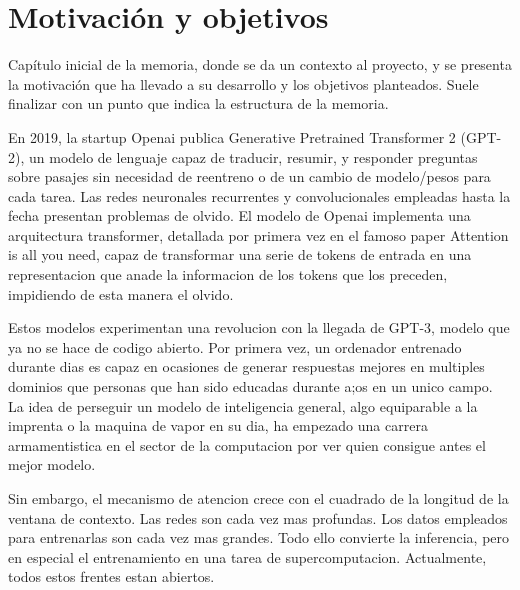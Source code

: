 \chapter{Motivación y objetivos}

Capítulo inicial de la memoria, donde se da un contexto al proyecto, y se presenta la motivación que ha llevado a su desarrollo y los objetivos planteados. Suele finalizar con un punto que indica la estructura de la memoria.


En 2019, la startup Openai publica Generative Pretrained Transformer 2 (GPT-2), un modelo de lenguaje capaz de traducir, resumir, y responder preguntas sobre pasajes sin necesidad de reentreno o de un cambio de modelo/pesos para cada tarea. Las redes neuronales recurrentes y convolucionales empleadas hasta la fecha presentan problemas de olvido. El modelo de Openai implementa una arquitectura transformer, detallada por primera vez en el famoso paper Attention is all you need, capaz de transformar una serie de tokens de entrada en una representacion que anade la informacion de los tokens que los preceden, impidiendo de esta manera el olvido.

Estos modelos experimentan una revolucion con la llegada de GPT-3, modelo que ya no se hace de codigo abierto. Por primera vez, un ordenador entrenado durante dias es capaz en ocasiones de generar respuestas mejores en multiples dominios que personas que han sido educadas durante a;os en un unico campo. La idea de perseguir un modelo de inteligencia general, algo equiparable a la imprenta o la maquina de vapor en su dia, ha empezado una carrera armamentistica en el sector de la computacion por ver quien consigue antes el mejor modelo.

Sin embargo, el mecanismo de atencion crece con el cuadrado de la longitud de la ventana de contexto. Las redes son cada vez mas profundas. Los datos empleados para entrenarlas son cada vez mas grandes. Todo ello convierte la inferencia, pero en especial el entrenamiento en una tarea de supercomputacion.
Actualmente, todos estos frentes estan abiertos.

